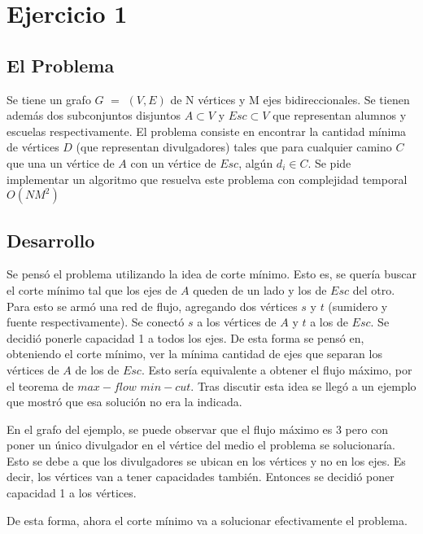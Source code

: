 \section{Ejercicio 1}
\subsection{El Problema}

Se tiene un grafo $G$ $=$ $(V,E)$ de N vértices y M ejes bidireccionales. Se tienen además dos subconjuntos disjuntos $A \subset V$ y $Esc \subset V$ que representan alumnos y escuelas respectivamente. El problema consiste en encontrar la cantidad mínima de vértices $D$ (que representan divulgadores)  tales que para cualquier camino $C$ que una un vértice de $A$ con un vértice de $Esc$, algún $d_i \in C$. Se pide implementar un algoritmo que resuelva este problema con complejidad temporal $O(NM^2)$

\subsection{Desarrollo}

Se pensó el problema utilizando la idea de corte mínimo. Esto es, se quería buscar el corte mínimo tal que los ejes de $A$ queden de un lado y los de $Esc$ del otro. Para esto se armó una red de flujo, agregando dos vértices $s$ y $t$ (sumidero y fuente respectivamente). Se conectó $s$ a los vértices de $A$ y $t$ a los de $Esc$. Se decidió ponerle capacidad 1 a todos los ejes. De esta forma se pensó en, obteniendo el corte mínimo, ver la mínima cantidad de ejes que separan los vértices de $A$ de los de $Esc$. Esto sería equivalente a obtener el flujo máximo, por el teorema de $max-flow$ $min-cut$. Tras discutir esta idea se llegó a un ejemplo que mostró que esa solución no era la indicada.


En el grafo del ejemplo, se puede observar que el flujo máximo es 3 pero con poner un único divulgador en el vértice del medio el problema se solucionaría. Esto se debe a que los divulgadores se ubican en los vértices y no en los ejes. Es decir, los vértices van a tener capacidades también. Entonces se decidió poner capacidad 1 a los vértices. 


De esta forma, ahora el corte mínimo va a solucionar efectivamente el problema. %

